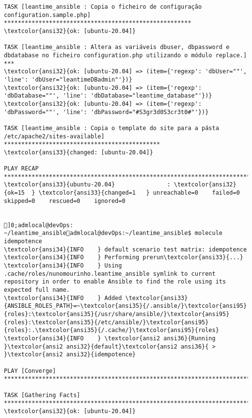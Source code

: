 \documentclass{scrartcl}
\begin{document}
\begin{Verbatim}
TASK [leantime_ansible : Copia o ficheiro de configuração configuration.sample.php] ******************************************************
\textcolor{ansi32}{ok: [ubuntu-20.04]}

TASK [leantime_ansible : Altera as variáveis dbuser, dbpassword e dbdatabase no ficheiro configuration.php utilizando o módulo replace.] ***
\textcolor{ansi32}{ok: [ubuntu-20.04] => (item={'regexp': 'dbUser=""', 'line': 'dbUser="leantimeDBadmin"'})}
\textcolor{ansi32}{ok: [ubuntu-20.04] => (item={'regexp': 'dbDatabase=""', 'line': 'dbDatabase="leantime_database"'})}
\textcolor{ansi32}{ok: [ubuntu-20.04] => (item={'regexp': 'dbPassword=""', 'line': 'dbPassword="#S3gr3d0S3cr3t0#"'})}

TASK [leantime_ansible : Copia o template do site para a pásta /etc/apache2/sites-available] *********************************************
\textcolor{ansi33}{changed: [ubuntu-20.04]}

PLAY RECAP *******************************************************************************************************************************
\textcolor{ansi33}{ubuntu-20.04}               : \textcolor{ansi32}{ok=15  } \textcolor{ansi33}{changed=1   } unreachable=0    failed=0    skipped=0    rescued=0    ignored=0


]0;admlocal@devOps: ~/leantime_ansibleadmlocal@devOps:~/leantime_ansible$ molecule idempotence
\textcolor{ansi34}{INFO    } default scenario test matrix: idempotence
\textcolor{ansi34}{INFO    } Performing prerun\textcolor{ansi33}{...}
\textcolor{ansi34}{INFO    } Using .cache/roles/nunomourinho.leantime_ansible symlink to current repository in order to enable Ansible to find the role using its expected full name.
\textcolor{ansi34}{INFO    } Added \textcolor{ansi33}{ANSIBLE_ROLES_PATH}=~\textcolor{ansi35}{/.ansible/}\textcolor{ansi95}{roles}:\textcolor{ansi35}{/usr/share/ansible/}\textcolor{ansi95}{roles}:\textcolor{ansi35}{/etc/ansible/}\textcolor{ansi95}{roles}:.\textcolor{ansi35}{/.cache/}\textcolor{ansi95}{roles}
\textcolor{ansi34}{INFO    } \textcolor{ansi2 ansi36}{Running }\textcolor{ansi2 ansi32}{default}\textcolor{ansi2 ansi36}{ > }\textcolor{ansi2 ansi32}{idempotence}

PLAY [Converge] **************************************************************************************************************************

TASK [Gathering Facts] *******************************************************************************************************************
\textcolor{ansi32}{ok: [ubuntu-20.04]}


\end{Verbatim}
\end{document}
